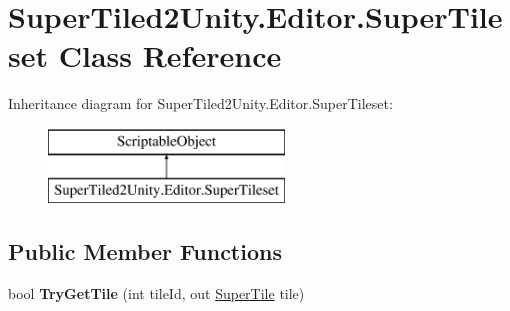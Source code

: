 \hypertarget{class_super_tiled2_unity_1_1_editor_1_1_super_tileset}{}\section{Super\+Tiled2\+Unity.\+Editor.\+Super\+Tileset Class Reference}
\label{class_super_tiled2_unity_1_1_editor_1_1_super_tileset}
Inheritance diagram for Super\+Tiled2\+Unity.\+Editor.\+Super\+Tileset\+:\begin{figure}[H]
\begin{center}
\leavevmode
\includegraphics[height=2.000000cm]{class_super_tiled2_unity_1_1_editor_1_1_super_tileset}
\end{center}
\end{figure}
\subsection*{Public Member Functions}
\begin{DoxyCompactItemize}
\item 
\mbox{\label{class_super_tiled2_unity_1_1_editor_1_1_super_tileset_ad631683f0439ec744ab05913208955dd}} 
bool {\bfseries Try\+Get\+Tile} (int tile\+Id, out \mbox{\hyperlink{class_super_tiled2_unity_1_1_super_tile}{Super\+Tile}} tile)
\end{DoxyCompactItemize}
